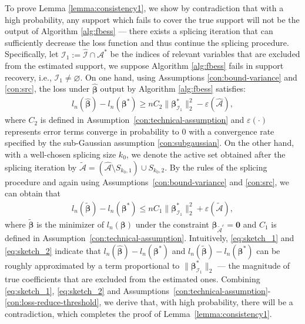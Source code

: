 To prove Lemma \ref{lemma:consistency1}, we show by contradiction that with a high probability, any support which fails to cover the true support will not be the output of Algorithm \ref{alg:fbess} --- there exists a splicing iteration that can sufficiently decrease the loss function and thus continue the splicing procedure.
Specifically,
let $\mathcal{I}_{1}:=\hat{\mathcal{I}}\cap\mathcal{A}^{*}$ be
the indices of relevant variables that are excluded from the estimated support,
we suppose Algorithm \ref{alg:fbess} fails in support recovery, i.e., $\mathcal{I}_{1}\neq\varnothing$.
On one hand, using Assumptions \ref{con:bound-variance} and \ref{con:src},
the loss under $\hat{\boldsymbol \beta}$ output by Algorithm \ref{alg:fbess} satisfies:
\begin{align}\label{eq:sketch_1}
l_n(\hat{\boldsymbol \beta}) - l_n(\boldsymbol \beta^*) \geq nC_2 \|\boldsymbol \beta^*_{\mathcal{I}_1} \|_2^2 - \varepsilon(\hat{\mathcal{A}}),
\end{align}
where $C_2$ is defined in Assumption~\ref{con:technical-assumption} and
$\varepsilon(\cdot)$ represents error terms converge in probability to $0$ with a convergence rate specified by the sub-Gaussian assumption \ref{con:subgaussian}.
On the other hand, with a well-chosen splicing size $k_0$, we denote the active set obtained after the splicing iteration by $\tilde{\mathcal{A}} = (\hat{\mathcal{A}}\setminus S_{k_0,1}) \cup S_{k_0,2}$.
By the rules of the splicing procedure and again using Assumptions~\ref{con:bound-variance} and \ref{con:src}, we can obtain that
\begin{align}\label{eq:sketch_2}
l_n(\tilde{\boldsymbol \beta}) - l_n(\boldsymbol \beta^*) \leq nC_1 \|\boldsymbol \beta^*_{\mathcal{I}_1} \|_2^2 + \varepsilon(\tilde{\mathcal{A}}),
\end{align}
where $\tilde{\boldsymbol \beta}$ is the minimizer of $l_n(\boldsymbol{\beta})$ under the constraint $\boldsymbol{\beta}_{\tilde{\mathcal{A}}^c} = \mathbf{0}$ and $C_1$ is defined in Assumption~\ref{con:technical-assumption}.
Intuitively, \eqref{eq:sketch_1} and \eqref{eq:sketch_2} indicate that $l_n(\hat{\boldsymbol \beta}) - l_n(\boldsymbol \beta^*)$ and $l_n(\tilde{\boldsymbol \beta}) - l_n(\boldsymbol \beta^*)$ can be roughly approximated by a term proportional to $\|\boldsymbol \beta^*_{\mathcal{I}_1}\|_{2}$ ---
the magnitude of true coefficients that are excluded from the estimated ones.
Combining \eqref{eq:sketch_1}, \eqref{eq:sketch_2} and Assumptions~\ref{con:technical-assumption}-\ref{con:loss-reduce-threshold}, we derive that, with high probability, there will be a contradiction, which completes the proof of Lemma~\ref{lemma:consistency1}.

